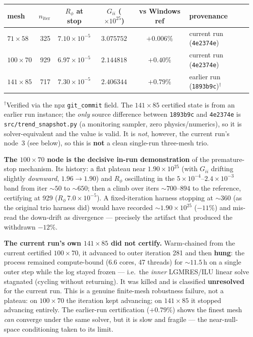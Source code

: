 \documentclass[11pt]{article}
\newcommand{\ten}[1]{\times 10^{#1}}
\begin{document}
\begin{center}\small
\begin{tabular}{l r c c c l}
\toprule
mesh & $n_{\mathrm{iter}}$ & $R_\phi$ at stop & $G_{ii}$ ($\ten{25}$) & vs Windows ref & provenance \\
\midrule
$71\times58$  & 325 & $7.10\ten{-5}$ & $3.075752$ & $+0.006\%$ & current run (\texttt{4e2374e}) \\
$100\times70$ & 929 & $6.97\ten{-5}$ & $2.144818$ & $+0.40\%$  & current run (\texttt{4e2374e}) \\
$141\times85$ & 717 & $7.30\ten{-5}$ & $2.406344$ & $+0.79\%$  & earlier run (\texttt{1893b9c})$^{\dagger}$ \\
\bottomrule
\end{tabular}
\end{center}
{\footnotesize $^{\dagger}$Verified via the npz \texttt{git\_commit} field. The $141\times85$ certified state is from an earlier run instance; the \emph{only} source difference between \texttt{1893b9c} and \texttt{4e2374e} is \texttt{src/trend\_snapshot.py} (a monitoring sampler, zero physics/numerics), so it is solver-equivalent and the value is valid. It is \emph{not}, however, the current run's node~3 (see below), so this is \textbf{not} a clean single-run three-mesh trio.}

\textbf{The $100\times70$ node is the decisive in-run demonstration} of the premature-stop mechanism. Its history: a flat plateau near $1.90\ten{25}$ (with $G_{ii}$ drifting slightly \emph{downward}, $1.96\to1.90$) and $R_\phi$ oscillating in the $5\ten{-4}$--$2.4\ten{-3}$ band from iter $\sim\!50$ to $\sim\!650$; then a climb over iters $\sim\!700$--$894$ to the reference, certifying at 929 ($R_\phi\,7.0\ten{-5}$). A fixed-iteration harness stopping at $\sim\!360$ (as the original trio harness did) would have recorded $\sim\!1.90\ten{25}$ ($-11\%$) and mis-read the down-drift as divergence --- precisely the artifact that produced the withdrawn $-12\%$.

\textbf{The current run's own $141\times85$ did not certify.} Warm-chained from the current certified $100\times70$, it advanced to outer iteration 281 and then \textbf{hung}: the process remained compute-bound (6.6 cores, 47 threads) for $\sim\!11.5$\,h on a single outer step while the log stayed frozen --- i.e.\ the \emph{inner} LGMRES/ILU linear solve stagnated (cycling without returning). It was killed and is classified \textbf{unresolved} for the current run. This is a genuine finite-mesh robustness failure, not a plateau: on $100\times70$ the iteration kept advancing; on $141\times85$ it stopped advancing entirely. The earlier-run certification ($+0.79\%$) shows the finest mesh \emph{can} converge under the same solver, but it is slow and fragile --- the near-null-space conditioning taken to its limit.
\end{document}
